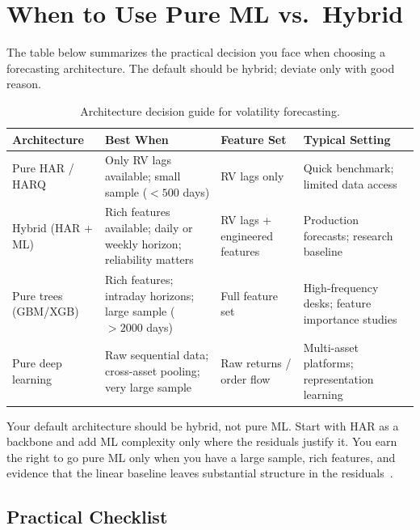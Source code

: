\section{When to Use Pure ML vs.\ Hybrid}\label{sec:hybrid:decision}

The table below summarizes the practical decision you face when choosing
a forecasting architecture.  The default should be hybrid; deviate only
with good reason.

\begin{table}[htbp]
\centering
\caption{Architecture decision guide for volatility forecasting.}
\label{tab:decision-guide}
\begin{tabular}{p{3.5cm}p{3.2cm}p{3.0cm}p{3.5cm}}
\toprule
\textbf{Architecture} & \textbf{Best When} & \textbf{Feature Set} &
  \textbf{Typical Setting} \\
\midrule
Pure HAR / HARQ
  & Only RV lags available; small sample ($<500$ days)
  & RV lags only
  & Quick benchmark; limited data access \\
\addlinespace
Hybrid (HAR + ML)
  & Rich features available; daily or weekly horizon; reliability matters
  & RV lags + engineered features
  & Production forecasts; research baseline \\
\addlinespace
Pure trees (GBM/XGB)
  & Rich features; intraday horizons; large sample ($>2000$ days)
  & Full feature set
  & High-frequency desks; feature importance studies \\
\addlinespace
Pure deep learning
  & Raw sequential data; cross-asset pooling; very large sample
  & Raw returns / order flow
  & Multi-asset platforms; representation learning \\
\bottomrule
\end{tabular}
\end{table}

\begin{keyidea}
Your default architecture should be hybrid, not pure ML.  Start with HAR
as a backbone and add ML complexity only where the residuals justify it.
You earn the right to go pure ML only when you have a large sample, rich
features, and evidence that the linear baseline leaves substantial
structure in the residuals~\citep{RahimikiaPoon2020}.
\end{keyidea}

\subsection{Practical Checklist}


